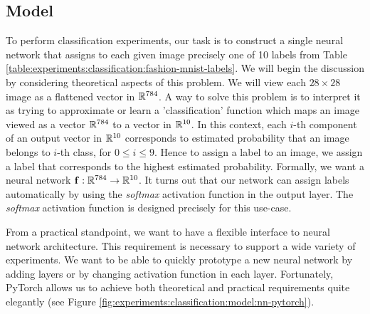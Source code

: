 \subsection{Model}
\label{subsection:experiments:classification:model}
To perform classification experiments, our task is to construct a single neural network that assigns to each given image precisely one of 10 labels from Table \ref{table:experiments:classification:fashion-mnist-labels}. We will begin the discussion by considering theoretical aspects of this problem. We will view each $28 \times 28$ image as a flattened vector in ${\mathbb R}^{784}$.
A way to solve this problem is to interpret it as trying to approximate or learn a 'classification' function which maps an image viewed as a vector  ${\mathbb R}^{784}$ to a vector in ${\mathbb R}^{10}$. In this context, each $i$-th component of an output vector in ${\mathbb R}^{10}$ corresponds to estimated probability that an image belongs to $i$-th class, for $0 \leq i \leq 9$. Hence to assign a label to an image, we assign a label that corresponds to the highest estimated probability. Formally, we want a neural network $\mathbf{f} : {\mathbb R}^{784} \to {\mathbb R}^{10}$. It turns out that our network can assign labels automatically by using the \textit{softmax} activation function in the output layer. The \textit{softmax} activation function is designed precisely for this use-case. 


From a practical standpoint, we want to have a flexible interface to neural network architecture. This requirement is necessary to support a wide variety of experiments. We want to be able to quickly prototype a new neural network by adding layers or by changing activation function in each layer. Fortunately, PyTorch allows us to achieve both theoretical and practical requirements quite elegantly (see Figure \ref{fig:experiments:classification:model:nn-pytorch}).

